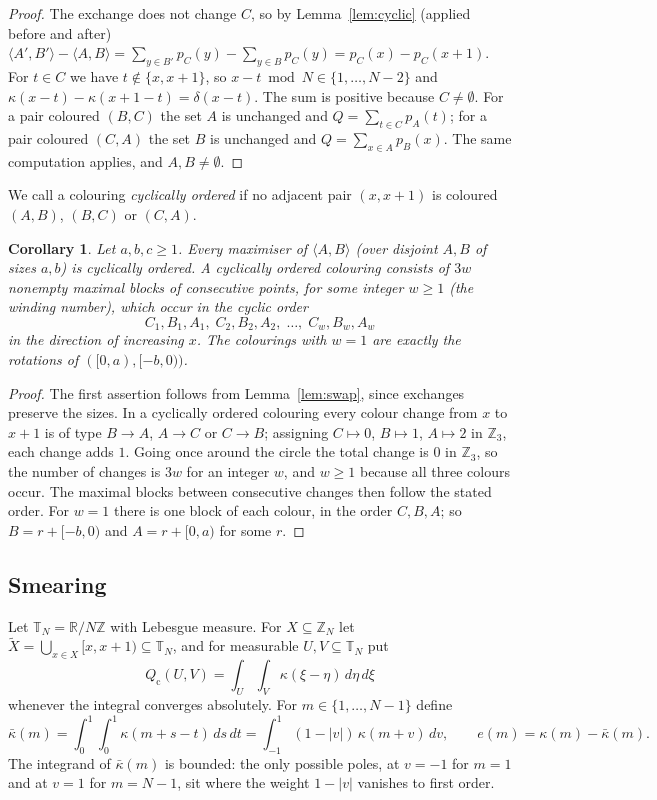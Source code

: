 \documentclass[11pt]{amsart}
\newtheorem{corollary}[theorem]{Corollary}
\theoremstyle{definition}
\theoremstyle{remark}
\newcommand{\Z}{\mathbb{Z}}
\newcommand{\R}{\mathbb{R}}
\newcommand{\T}{\mathbb{T}}
\newcommand{\ip}[2]{\langle #1,#2\rangle}
\newcommand{\Qc}{Q_{\mathrm{c}}}
\newcommand{\kb}{\bar\kappa}
\begin{document}
\begin{proof}
The exchange does not change $C$, so by Lemma~\ref{lem:cyclic} (applied before and after)
$\ip{A'}{B'}-\ip AB=\sum_{y\in B'}p_C(y)-\sum_{y\in B}p_C(y)=p_C(x)-p_C(x+1)$. For $t\in C$ we have
$t\notin\{x,x+1\}$, so $x-t\bmod N\in\{1,\dots,N-2\}$ and $\kappa(x-t)-\kappa(x+1-t)=\delta(x-t)$. The sum is
positive because $C\neq\emptyset$. For a pair coloured $(B,C)$ the set $A$ is unchanged and
$Q=\sum_{t\in C}p_A(t)$; for a pair coloured $(C,A)$ the set $B$ is unchanged and $Q=\sum_{x\in A}p_B(x)$. The same
computation applies, and $A,B\ne\emptyset$.
\end{proof}

We call a colouring \emph{cyclically ordered} if no adjacent pair $(x,x+1)$ is coloured $(A,B)$, $(B,C)$ or $(C,A)$.

\begin{corollary}\label{cor:monotone}
Let $a,b,c\ge1$. Every maximiser of $\ip AB$ (over disjoint $A,B$ of sizes $a,b$) is cyclically ordered. A
cyclically ordered colouring consists of $3w$ nonempty maximal blocks of consecutive points, for some integer
$w\ge1$ (the winding number), which occur in the cyclic order
\[
C_1,B_1,A_1,\;C_2,B_2,A_2,\;\dots,\;C_w,B_w,A_w
\]
in the direction of increasing $x$. The colourings with $w=1$ are exactly the rotations of $([0,a),[-b,0))$.
\end{corollary}

\begin{proof}
The first assertion follows from Lemma~\ref{lem:swap}, since exchanges preserve the sizes. In a cyclically
ordered colouring every colour change from $x$ to $x+1$ is of type $B\to A$, $A\to C$ or $C\to B$; assigning
$C\mapsto0$, $B\mapsto1$, $A\mapsto2$ in $\Z_3$, each change adds $1$. Going once around the circle the total
change is $0$ in $\Z_3$, so the number of changes is $3w$ for an integer $w$, and $w\ge1$ because all three colours
occur. The maximal blocks between consecutive changes then follow the stated order. For $w=1$ there is one block
of each colour, in the order $C,B,A$; so $B=r+[-b,0)$ and $A=r+[0,a)$ for some $r$.
\end{proof}

\subsection{Smearing}
Let $\T_N=\R/N\Z$ with Lebesgue measure. For $X\subseteq\Z_N$ let $\widetilde X=\bigcup_{x\in X}[x,x+1)\subseteq\T_N$,
and for measurable $U,V\subseteq\T_N$ put
\[
\Qc(U,V)=\int_U\int_V\kappa(\xi-\eta)\,d\eta\,d\xi
\]
whenever the integral converges absolutely. For $m\in\{1,\dots,N-1\}$ define
\[
\kb(m)=\int_0^1\!\!\int_0^1\kappa(m+s-t)\,ds\,dt=\int_{-1}^{1}(1-|v|)\,\kappa(m+v)\,dv,\qquad e(m)=\kappa(m)-\kb(m).
\]
The integrand of $\kb(m)$ is bounded: the only possible poles, at $v=-1$ for $m=1$ and at $v=1$ for $m=N-1$, sit
where the weight $1-|v|$ vanishes to first order.
\end{document}
